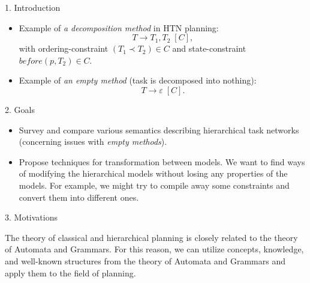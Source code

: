 \documentclass[portrait,a0paper,fontscale=0.25]{baposter}
\begin{document}
\begin{poster}
\begin{posterbox}[column=0,name=intro]{1. Introduction}
\begin{itemize}
    \item Example of \emph{a decomposition method} in HTN planning:
    $$ T \rightarrow T_1, T_2 \; [C],$$ with ordering-constraint $(T_1 \prec T_2) \in C$ and state-constraint $be\!f\!ore(p, T_2) \in C$.

    \item Example of \emph{an empty method} (task is decomposed into nothing):
    $$ T \rightarrow \varepsilon \; [C].$$
\end{itemize}

\end{posterbox}

\begin{posterbox}[column=0, name=goals, below=intro, headerColorOne=cyan!60, boxColorOne=cyan!20]{2. Goals}

\begin{itemize}
    \item Survey and compare various semantics describing hierarchical task networks (concerning issues with \emph{empty methods}).

    \item Propose techniques for transformation between models. We want to find ways of modifying the hierarchical models without losing any properties of the models. For example, we might try to compile away some constraints and convert them into different ones.
\end{itemize}

\end{posterbox}

\begin{posterbox}[column=0, name=motivation, below=goals]{3. Motivations}

The theory of classical and hierarchical planning is closely related to the theory of Automata and Grammars. For this reason, we can utilize concepts, knowledge, and well-known structures from the theory of Automata and Grammars and apply them to the field of planning.

\end{posterbox}

%
%




\end{poster}
\end{document}
